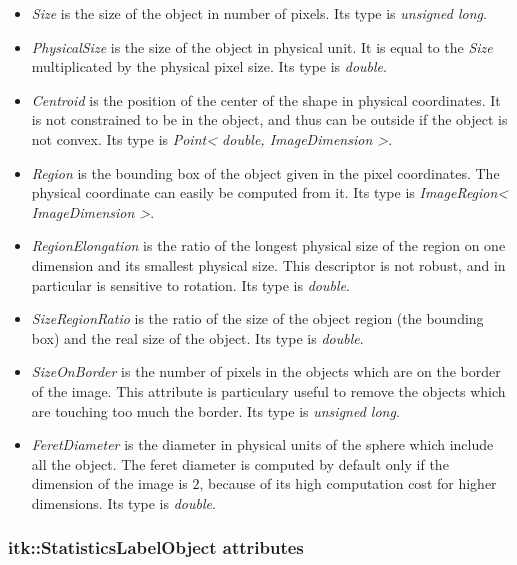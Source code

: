 \documentclass{InsightArticle}
\begin{document}
\begin{itemize}
  \item {\em Size} is the size of the object in number of pixels. Its type is
{\em unsigned long}.
  \item {\em PhysicalSize} is the size of the object in physical unit. It is equal
to the {\em Size} multiplicated by the physical pixel size. Its type is {\em double}.
  \item {\em Centroid} is the position of the center of the shape in physical coordinates. It is not
constrained to be in the object, and thus can be outside if the object is not convex.
Its type is {\em Point< double, ImageDimension >}. 
  \item {\em Region} is the bounding box of the object given in the pixel coordinates.
The physical coordinate can easily be computed from it. Its type is
{\em ImageRegion< ImageDimension >}.
  \item {\em RegionElongation} is the ratio of the longest physical size of the region
on one dimension and its smallest physical size. This descriptor is not robust, and in
particular is sensitive to rotation. Its type is {\em double}.
  \item {\em SizeRegionRatio} is the ratio of the size of the object region (the
bounding box) and the real size of the object. Its type is {\em double}.
  \item {\em SizeOnBorder} is the number of pixels in the objects which are on the border
of the image. This attribute is particulary useful to remove the objects which are touching
too much the border. Its type is {\em unsigned long}.
  \item {\em FeretDiameter} is the diameter in physical units of the sphere which include
all the object. The feret diameter is computed by default only if the dimension of the image
is $2$, because of its high computation cost for higher dimensions. Its type is {\em double}.
\end{itemize}


\subsubsection{itk::StatisticsLabelObject attributes}
\end{document}
